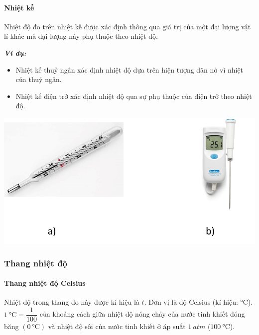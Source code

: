 \paragraph{Nhiệt kế}
\begin{boxdn}
	Nhiệt độ đo trên nhiệt kế được xác định thông qua giá trị của một đại lượng vật lí khác mà đại lượng này phụ thuộc theo nhiệt độ.
\end{boxdn}
\begin{boxvidu}
	\textbf{\textit{Ví dụ:}}
	\begin{itemize}
		\item Nhiệt kế thuỷ ngân xác định nhiệt độ dựa trên hiện tượng dãn nở vì nhiệt của thuỷ ngân.
		\item Nhiệt kế điện trở xác định nhiệt độ qua sự phụ thuộc của điện trở theo nhiệt độ.
	\end{itemize}
\end{boxvidu}
\begin{center}
	\includegraphics[width=0.5\linewidth]{figs/VN12-Y24-PH-SYL-002-2}
\end{center}
\subsubsection{Thang nhiệt độ}
\paragraph{Thang nhiệt độ Celsius}
\begin{boxdn}
	Nhiệt độ trong thang đo này được kí hiệu là $t$. Đơn vị là độ Celsius (kí hiệu: $\si{\celsius}$).\\
	$\SI{1}{\celsius}=\dfrac{1}{100}$ của khoảng cách giữa nhiệt độ nóng chảy của nước tinh khiết đóng băng $\left(\SI{0}{\celsius}\right)$ và nhiệt độ sôi của nước tinh khiết ở áp suất $\SI{1}{atm}$ ($\SI{100}{\celsius}$).
\end{boxdn}

